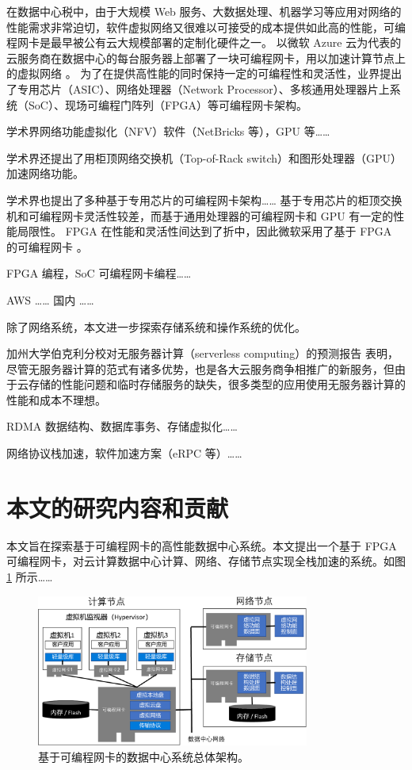 在数据中心税中，由于大规模 Web 服务、大数据处理、机器学习等应用对网络的性能需求非常迫切，软件虚拟网络又很难以可接受的成本提供如此高的性能，可编程网卡是最早被公有云大规模部署的定制化硬件之一。
以微软 Azure 云为代表的云服务商在数据中心的每台服务器上部署了一块可编程网卡，用以加速计算节点上的虚拟网络 \cite{smartnic}。
为了在提供高性能的同时保持一定的可编程性和灵活性，业界提出了专用芯片（ASIC）、网络处理器（Network Processor）、多核通用处理器片上系统（SoC）、现场可编程门阵列（FPGA）等可编程网卡架构。





学术界网络功能虚拟化（NFV）软件（NetBricks 等），GPU 等……

学术界还提出了用柜顶网络交换机（Top-of-Rack switch）和图形处理器（GPU）加速网络功能。

学术界也提出了多种基于专用芯片的可编程网卡架构……
基于专用芯片的柜顶交换机和可编程网卡灵活性较差，而基于通用处理器的可编程网卡和 GPU 有一定的性能局限性。
FPGA 在性能和灵活性间达到了折中，因此微软采用了基于 FPGA 的可编程网卡 \cite{putnam2014reconfigurable}。

FPGA 编程，SoC 可编程网卡编程……

AWS …… 国内 ……

除了网络系统，本文进一步探索存储系统和操作系统的优化。


加州大学伯克利分校对无服务器计算（serverless computing）的预测报告 \cite{jonas2019cloud} 表明，尽管无服务器计算的范式有诸多优势，也是各大云服务商争相推广的新服务，但由于云存储的性能问题和临时存储服务的缺失，很多类型的应用使用无服务器计算的性能和成本不理想。

RDMA 数据结构、数据库事务、存储虚拟化……

网络协议栈加速，软件加速方案（eRPC 等）……



\section{本文的研究内容和贡献}


本文旨在探索基于可编程网卡的高性能数据中心系统。本文提出一个基于 FPGA 可编程网卡，对云计算数据中心计算、网络、存储节点实现全栈加速的系统。如图 \ref{arch:fig:accel-arch} 所示……


\begin{figure}[htbp]
	\centering
	\includegraphics[width=0.8\textwidth]{figures/accel_arch.pdf}
	\caption{基于可编程网卡的数据中心系统总体架构。}
	\label{arch:fig:accel-arch}
\end{figure}

